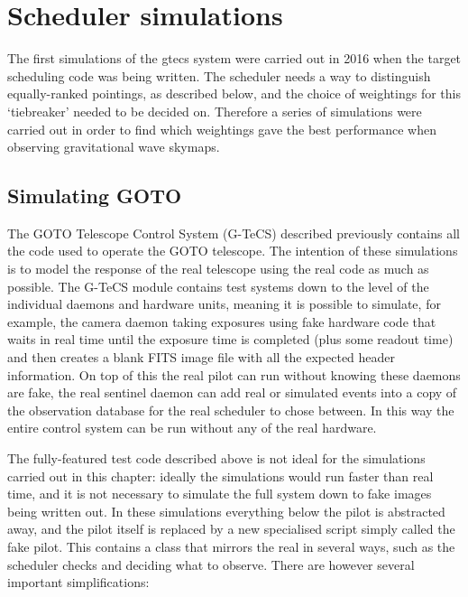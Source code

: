 
\newpage
\section{Scheduler simulations}
\label{sec:scheduler_sims}
\begin{colsection}


\begin{colsection}

The first simulations of the \gls{gtecs} system were carried out in 2016 when the target scheduling code was being written. The scheduler needs a way to distinguish equally-ranked pointings, as described below, and the choice of weightings for this `tiebreaker' needed to be decided on. Therefore a series of simulations were carried out in order to find which weightings gave the best performance when observing gravitational wave skymaps.

\end{colsection}


\subsection{Simulating GOTO}
\label{sec:goto_sims}
\begin{colsection}

The GOTO Telescope Control System (G-TeCS) described previously contains all the code used to operate the GOTO telescope. The intention of these simulations is to model the response of the real telescope using the real code as much as possible. The G-TeCS module contains test systems down to the level of the individual daemons and hardware units, meaning it is possible to simulate, for example, the camera daemon taking exposures using fake hardware code that waits in real time until the exposure time is completed (plus some readout time) and then creates a blank FITS image file with all the expected header information. On top of this the real pilot can run without knowing these daemons are fake, the real sentinel daemon can add real or simulated events into a copy of the observation database for the real scheduler to chose between. In this way the entire control system can be run without any of the real hardware.

The fully-featured test code described above is not ideal for the simulations carried out in this chapter: ideally the simulations would run faster than real time, and it is not necessary to simulate the full system down to fake images being written out. In these simulations everything below the pilot is abstracted away, and the pilot itself is replaced by a new specialised script simply called the fake pilot. This contains a class  that mirrors the real  in several ways, such as the scheduler checks and deciding what to observe. There are however several important simplifications:


\end{colsection}
\end{colsection}
